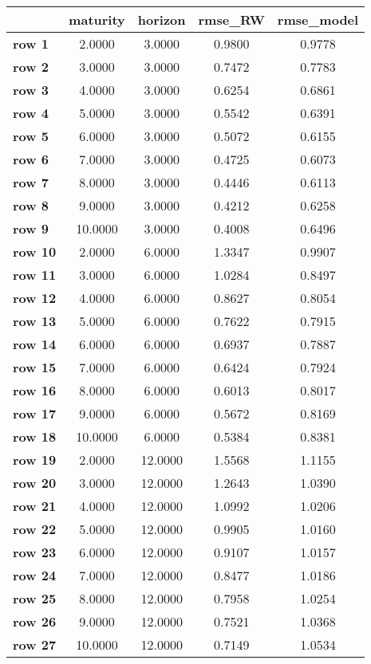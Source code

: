 \begin{tiny}\begin{tabular}{|l|c|c|c|c|}
\hline
&\textbf{maturity}&\textbf{horizon}&\textbf{rmse_RW}&\textbf{rmse_model}\\\hline
\textbf{row 1}&2.0000&3.0000&0.9800&0.9778\\\hline
\textbf{row 2}&3.0000&3.0000&0.7472&0.7783\\\hline
\textbf{row 3}&4.0000&3.0000&0.6254&0.6861\\\hline
\textbf{row 4}&5.0000&3.0000&0.5542&0.6391\\\hline
\textbf{row 5}&6.0000&3.0000&0.5072&0.6155\\\hline
\textbf{row 6}&7.0000&3.0000&0.4725&0.6073\\\hline
\textbf{row 7}&8.0000&3.0000&0.4446&0.6113\\\hline
\textbf{row 8}&9.0000&3.0000&0.4212&0.6258\\\hline
\textbf{row 9}&10.0000&3.0000&0.4008&0.6496\\\hline
\textbf{row 10}&2.0000&6.0000&1.3347&0.9907\\\hline
\textbf{row 11}&3.0000&6.0000&1.0284&0.8497\\\hline
\textbf{row 12}&4.0000&6.0000&0.8627&0.8054\\\hline
\textbf{row 13}&5.0000&6.0000&0.7622&0.7915\\\hline
\textbf{row 14}&6.0000&6.0000&0.6937&0.7887\\\hline
\textbf{row 15}&7.0000&6.0000&0.6424&0.7924\\\hline
\textbf{row 16}&8.0000&6.0000&0.6013&0.8017\\\hline
\textbf{row 17}&9.0000&6.0000&0.5672&0.8169\\\hline
\textbf{row 18}&10.0000&6.0000&0.5384&0.8381\\\hline
\textbf{row 19}&2.0000&12.0000&1.5568&1.1155\\\hline
\textbf{row 20}&3.0000&12.0000&1.2643&1.0390\\\hline
\textbf{row 21}&4.0000&12.0000&1.0992&1.0206\\\hline
\textbf{row 22}&5.0000&12.0000&0.9905&1.0160\\\hline
\textbf{row 23}&6.0000&12.0000&0.9107&1.0157\\\hline
\textbf{row 24}&7.0000&12.0000&0.8477&1.0186\\\hline
\textbf{row 25}&8.0000&12.0000&0.7958&1.0254\\\hline
\textbf{row 26}&9.0000&12.0000&0.7521&1.0368\\\hline
\textbf{row 27}&10.0000&12.0000&0.7149&1.0534\\\hline
\end{tabular}
\end{tiny}